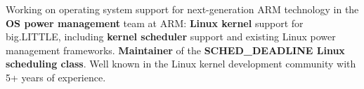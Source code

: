 

\begin{cvparagraph}

Working on operating system support for next-generation ARM technology in the
	\textbf{OS power management} team at ARM: \textbf{Linux kernel} support for big.LITTLE,
	including \textbf{kernel scheduler} support and existing Linux power management
	frameworks. \textbf{Maintainer} of the \textbf{SCHED\_DEADLINE Linux scheduling class}.
	Well known in the Linux kernel development community with 5+ years of
	experience.
\end{cvparagraph}
